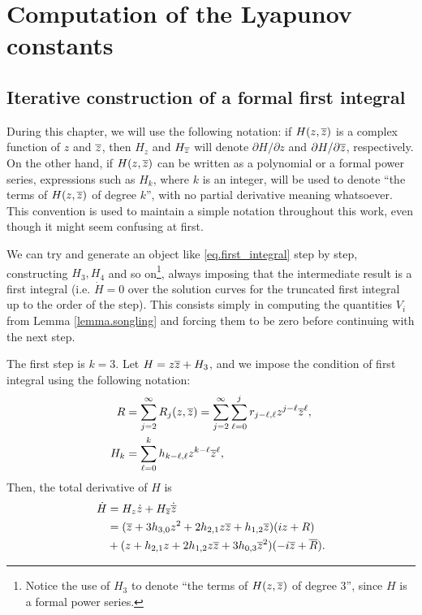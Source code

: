 
\chapter{Computation of the Lyapunov constants}

\section{Iterative construction of a formal first integral} 

\begin{observacio}
During this chapter, we will use the following notation: if $H(z,\overline{z})$ is a complex function of $z$ and $\overline{z}$, then $H_z$ and $H_{\overline{z}}$ will denote $\partial H/\partial z$ and $\partial H/\partial\overline{z}$, respectively. On the other hand, if $H(z,\overline{z})$ can be written as a polynomial or a formal power series, expressions such as $H_k$, where $k$ is an integer, will be used to denote ``the terms of $H(z,\overline{z})$ of degree $k$'', with no partial derivative meaning whatsoever. This convention is used to maintain a simple notation throughout this work, even though it might seem confusing at first.
\end{observacio}

We can try and generate an object like \eqref{eq.first_integral} step by step, constructing $H_3,H_4$ and so on\footnote{Notice the use of $H_3$ to denote ``the terms of $H(z,\overline{z})$ of degree 3'', since $H$ is a formal power series.}, always imposing that the intermediate result is a first integral (i.e. $\dot H=0$ over the solution curves for the truncated first integral up to the order of the step). This consists simply in computing the quantities $V_i$ from Lemma \ref{lemma.songling} and forcing them to be zero before continuing with the next step.

The first step is $k=3$. Let $H=z{\overline{z}}+H_3$, and we impose the condition of first integral using the following notation:
\begin{align}
R &= \sum_{j=2}^\infty R_j(z,{\overline{z}}) = \sum_{j=2}^\infty \sum_{\ell=0}^j r_{j-\ell,\ell}z^{j-\ell}{\overline{z}}^\ell,\\
H_k &= \sum_{\ell=0}^k h_{k-\ell,\ell}z^{k-\ell}\overline{z}^\ell,
\end{align}
Then, the total derivative of $H$ is
\begin{align*}
\dot H&=H_z\dot z+H_{\overline{z}}\dot {\overline{z}} \\
&= ({\overline{z}}+3h_{3,0}z^2+2h_{2,1}z{\overline{z}}+h_{1,2}{\overline{z}})(iz+R) \\
&{}+ (z+h_{2,1}z+2h_{1,2}z{\overline{z}}+3h_{0,3}{\overline{z}}^2)(-i{\overline{z}}+\overline R).
\end{align*}

